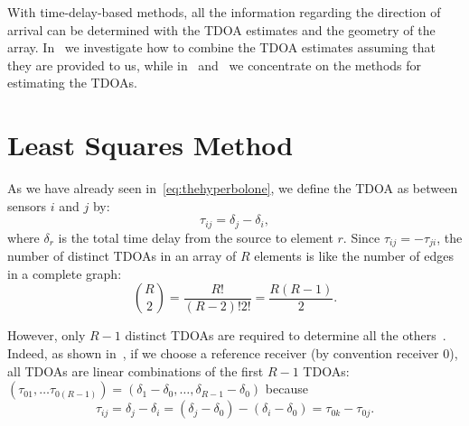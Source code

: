 \newpage
\noindent
With time-delay-based methods, all the information regarding the direction of arrival can be determined with the TDOA estimates and the geometry of the array. In~ we investigate how to combine the TDOA estimates assuming that they are provided to us, while in~ and~ we concentrate on the methods for estimating the TDOAs.

\section{Least Squares Method}\label{sub:LS}

As we have already seen in~\eqref{eq:thehyperbolone}, we define the TDOA as between sensors \(i\) and \(j\) by:
\begin{equation}
\tau_{ij}=\delta_j-\delta_i,
\label{eq:theboch}
\end{equation}
where \(\delta_r\) is the total time delay from the source to element \(r\). Since \(\tau_{ij}=-\tau_{ji}\), the number of distinct TDOAs in an array of \(R\) elements is like the number of edges in a complete graph:
\begin{equation}
\binom{R}{2}=\frac{R!}{(R-2)!2!}=\frac{R(R-1)}{2}.
\end{equation}



\noindent
 However, only \(R-1\) distinct TDOAs are required to determine all the others~\cite{passive_localization}. Indeed, as shown in~, if we choose a reference receiver (by convention receiver \(0\)), all TDOAs are linear combinations of the first \(R-1\) TDOAs: \((\tau_{01},\ldots\tau_{0(R-1)})=(\delta_1-\delta_0,\ldots,\delta_{R-1}-\delta_0)\) because
\begin{equation}
\tau_{ij}=\delta_j-\delta_i=\left(\delta_j-\delta_0\right)-\left(\delta_i-\delta_0\right)=\tau_{0k}-\tau_{0j}.
\label{eq:cirular}
\end{equation}

